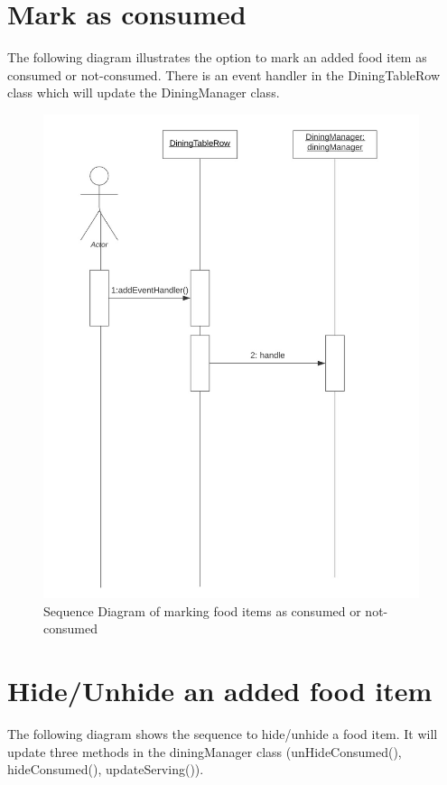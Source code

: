\documentclass{scrreprt}
\begin{document}
\FloatBarrier

\section{Mark as consumed}

The following diagram illustrates the option to mark an added food item as consumed or not-consumed. There is an event handler in the DiningTableRow class which will update the DiningManager class.

\begin{figure}[!htbp]
\centering
\includegraphics[width=11cm]{pictures/mark-consumed-sd.png}
\caption*{Sequence Diagram of marking food items as consumed or not-consumed}
\end{figure}

\FloatBarrier

\section{Hide/Unhide an added food item}

The following diagram shows the sequence to hide/unhide a food item. It will  update three methods in the diningManager class (unHideConsumed(), hideConsumed(), updateServing()).
\end{document}

